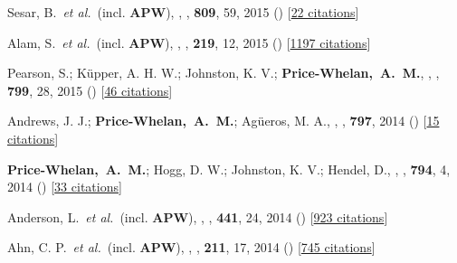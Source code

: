 \item[{\color{deemph}\scriptsize17}]Sesar, B.~\textit{et al.}~(incl. \textbf{APW}), , \apj, \textbf{809}, 59, 2015 () [\href{http://adsabs.harvard.edu/abs/2015ApJ...809...59S}{22 citations}]

\item[{\color{deemph}\scriptsize16}]Alam, S.~\textit{et al.}~(incl. \textbf{APW}), , \apjs, \textbf{219}, 12, 2015 () [\href{http://adsabs.harvard.edu/abs/2015ApJS..219...12A}{1197 citations}]

\item[{\color{deemph}\scriptsize15}]Pearson, S.; K{\"u}pper, A. H. W.; Johnston, K. V.; \textbf{Price-Whelan,~A.~M.}, , \apj, \textbf{799}, 28, 2015 () [\href{http://adsabs.harvard.edu/abs/2015ApJ...799...28P}{46 citations}]

\item[{\color{deemph}\scriptsize14}]Andrews, J. J.; \textbf{Price-Whelan,~A.~M.}; Ag{\"u}eros, M. A., , \apj, \textbf{797}, 2014 () [\href{http://adsabs.harvard.edu/abs/2014ApJ...797L..32A}{15 citations}]

\item[{\color{deemph}\scriptsize13}]\textbf{Price-Whelan,~A.~M.}; Hogg, D. W.; Johnston, K. V.; Hendel, D., , \apj, \textbf{794}, 4, 2014 () [\href{http://adsabs.harvard.edu/abs/2014ApJ...794....4P}{33 citations}]

\item[{\color{deemph}\scriptsize12}]Anderson, L.~\textit{et al.}~(incl. \textbf{APW}), , \mnras, \textbf{441}, 24, 2014 () [\href{http://adsabs.harvard.edu/abs/2014MNRAS.441...24A}{923 citations}]

\item[{\color{deemph}\scriptsize11}]Ahn, C. P.~\textit{et al.}~(incl. \textbf{APW}), , \apjs, \textbf{211}, 17, 2014 () [\href{http://adsabs.harvard.edu/abs/2014ApJS..211...17A}{745 citations}]

